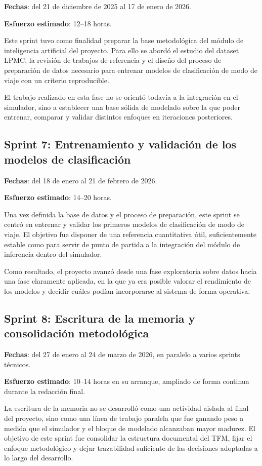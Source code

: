 \textbf{Fechas}: del 21 de diciembre de 2025 al 17 de enero de 2026.

\textbf{Esfuerzo estimado}: 12--18 horas.

Este sprint tuvo como finalidad preparar la base metodológica del módulo de inteligencia artificial del proyecto. Para ello se abordó el estudio del dataset LPMC, la revisión de trabajos de referencia y el diseño del proceso de preparación de datos necesario para entrenar modelos de clasificación de modo de viaje con un criterio reproducible.

El trabajo realizado en esta fase no se orientó todavía a la integración en el simulador, sino a establecer una base sólida de modelado sobre la que poder entrenar, comparar y validar distintos enfoques en iteraciones posteriores.

\subsection{Sprint 7: Entrenamiento y validación de los modelos de clasificación}

\textbf{Fechas}: del 18 de enero al 21 de febrero de 2026.

\textbf{Esfuerzo estimado}: 14--20 horas.

Una vez definida la base de datos y el proceso de preparación, este sprint se centró en entrenar y validar los primeros modelos de clasificación de modo de viaje. El objetivo fue disponer de una referencia cuantitativa útil, suficientemente estable como para servir de punto de partida a la integración del módulo de inferencia dentro del simulador.

Como resultado, el proyecto avanzó desde una fase exploratoria sobre datos hacia una fase claramente aplicada, en la que ya era posible valorar el rendimiento de los modelos y decidir cuáles podían incorporarse al sistema de forma operativa.

\subsection{Sprint 8: Escritura de la memoria y consolidación metodológica}

\textbf{Fechas}: del 27 de enero al 24 de marzo de 2026, en paralelo a varios sprints técnicos.

\textbf{Esfuerzo estimado}: 10--14 horas en su arranque, ampliado de forma continua durante la redacción final.

La escritura de la memoria no se desarrolló como una actividad aislada al final del proyecto, sino como una línea de trabajo paralela que fue ganando peso a medida que el simulador y el bloque de modelado alcanzaban mayor madurez. El objetivo de este sprint fue consolidar la estructura documental del TFM, fijar el enfoque metodológico y dejar trazabilidad suficiente de las decisiones adoptadas a lo largo del desarrollo.

